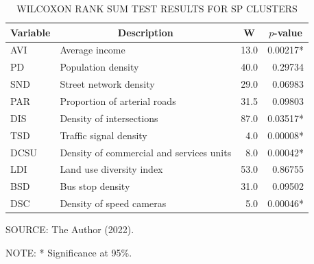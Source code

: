 \begin{table}
    \footnotesize
    \captionsetup{justification=raggedright,
        singlelinecheck=false,
        font=footnotesize}
    \caption{WILCOXON RANK SUM TEST RESULTS FOR SP CLUSTERS}
    \centering
    \begin{tabular}{llrr}
        \hline
        \multicolumn{1}{c}{\textbf{Variable}} & \multicolumn{1}{c}{\textbf{Description}} & \multicolumn{1}{c}{\textbf{W}} & \multicolumn{1}{c}{\textbf{$p$-value}} \\
        \hline
        AVI  & Average income                           & 13.0 & 0.00217* \\
        PD   & Population density                       & 40.0 & 0.29734  \\
        SND  & Street network density                   & 29.0 & 0.06983  \\
        PAR  & Proportion of arterial roads             & 31.5 & 0.09803  \\
        DIS  & Density of intersections                 & 87.0 & 0.03517* \\
        TSD  & Traffic signal density                   &  4.0 & 0.00008* \\
        DCSU & Density of commercial and services units &  8.0 & 0.00042* \\
        LDI  & Land use diversity index                 & 53.0 & 0.86755  \\
        BSD  & Bus stop density                         & 31.0 & 0.09502  \\
        DSC  & Density of speed cameras                 &  5.0 & 0.00046* \\
        \hline
    \end{tabular}
    \label{tab:wilcox_sp}
    \par \vspace{2mm} \footnotesize \raggedright
    SOURCE: The Author (2022).
    \par
    NOTE: * Significance at 95\%.
\end{table}


